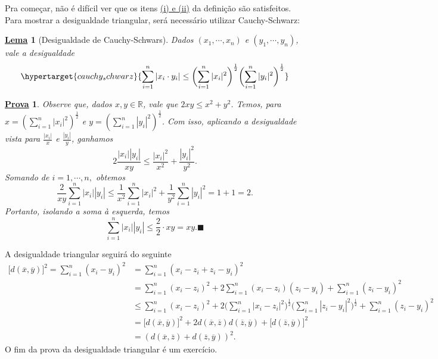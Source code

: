 \documentclass{article}
\newtheorem*{lemma*}{\underline{Lema}}
\newtheorem*{proof*}{\underline{Prova}}
\renewcommand\qedsymbol{$\blacksquare$}
\begin{document}
  Pra começar, não é difícil ver que os itens \hyperlink{def_metric}{(i) e (ii)} da definição são satisfeitos. Para mostrar a desigualdade triangular, será necessário
utilizar Cauchy-Schwarz: 
\begin{lemma*}[Desigualdade de Cauchy-Schwars]Dados \((x_{1}, \cdots, x_{n})\) e \((y_{1}, \cdots, y_{n})\), vale a desigualdade
  \[
    \hypertarget{cauchy_schwarz}{\sum\limits_{i=1}^{n}|x_{i}\cdot y_{i}|\leq \biggl(\sum\limits_{i=1}^{n}|x_{i}|^{2}\biggr)^{\frac{1}{2}}\biggl(\sum\limits_{i=1}^{n}|y_{i}|^{2}\biggr)^{\frac{1}{2}} }
  \]
\end{lemma*}
\begin{proof*}
  Observe que, dados \(x, y\in \mathbb{R}\), vale que \(2xy\leq x^{2} + y^{2}\).
  Temos, para \(x=(\sum\limits_{i=1}^{n}|x_{i}|^{2})^{\frac{1}{2}}\) e \(y=(\sum\limits_{i=1}^{n}|y_{i}|^{2})^{\frac{1}{2}}\). Com isso, aplicando a desigualdade vista para
  \(\frac{|x_{i}|}{x}\) e \(\frac{|y_{i}|}{y}\), ganhamos 
    \[
      2\frac{|x_{i}||y_{i}|}{xy}\leq \frac{|x_{i}|^{2}}{x^{2}} + \frac{|y_{i}|^{2}}{y^{2}}.
    \]
    Somando de \(i=1, \cdots, n,\) obtemos 
      \[
        \frac{2}{xy}\sum\limits_{i=1}^{n}|x_{i}||y_{i}| \leq \frac{1}{x^{2}}\sum\limits_{i=1}^{n}|x_{i}|^{2} + \frac{1}{y^{2}}\sum\limits_{i=1}^{n}|y_{i}|^{2} = 1 + 1 = 2.
      \]
    Portanto, isolando a soma à esquerda, temos 
      \[
        \sum\limits_{i=1}^{n}|x_{i}||y_{i}|\leq \frac{2}{2}\cdot xy = xy.\text{\qedsymbol}
      \]
    \end{proof*}
  A desigualdade triangular seguirá do seguinte 
  \begin{align*}
    \bigl[d(\overline{x}, \overline{y})\bigr]^{2} = \sum\limits_{i=1}^{n}(x_{i}-y_{i})^{2} &=\sum\limits_{i=1}^{n}(x_{i}-z_{i}+z_{i}-y_{i})^{2}\\
                                                                                           &=\sum\limits_{i=1}^{n}(x_{i}-z_{i})^{2} + 2\sum\limits_{i=1}^{n}(x_{i}-z_{i})(z_{i}-y_{i}) + \sum\limits_{i=1}^{n}(z_{i}-y_{i})^{2}\\
                                                                                           &\leq \sum\limits_{i=1}^{n}(x_{i}-z_{i})^{2} + 2\biggl(\sum\limits_{i=1}^{n}|x_{i}-z_{i}|^{2}\biggr)^{\frac{1}{2}}\biggl(\sum\limits_{i=1}^{n}|z_{i}-y_{i}|^{2}\biggr)^{\frac{1}{2}} + \sum\limits_{i=1}^{n}(z_{i}-y_{i})^{2}\\
                                                                                           &=\bigl[d(\overline{x}, \overline{y})\bigl]^{2} + 2 d(\overline{x}, \overline{z})d(\overline{z}, \overline{y}) + \bigl[d(\overline{z}, \overline{y})\bigr]^{2} \\
                                                                                           & = (d(\overline{x}, \overline{z})+d(\overline{z}, \overline{y}))^{2}.
  \end{align*}
  O fim da prova da desigualdade triangular é um exercício.
\newpage
\end{document}
